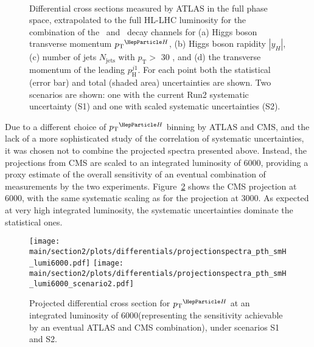 \begin{figure}
  \centering
   \\
  \caption{Differential cross sections measured by ATLAS in the full phase space, extrapolated to the full HL-LHC luminosity for the combination of the \Hyy\ and \HZZ\ decay channels for (a) Higgs boson transverse momentum $\pTH$, (b) Higgs boson rapidity $|y_H|$, (c) number of jets $N_{\mathrm{jets}}$ with  $p_{\mathrm{T}} >$ 30 \UGeV, and (d) the transverse momentum of the leading $p_{\mathrm{H}}^{j1}$. For each point both the statistical (error bar) and total (shaded area) uncertainties are shown. Two scenarios are shown: one with the current Run2 systematic uncertainty (S1) and one with scaled systematic uncertainties (S2).}
   \label{fig:ATLAS_proj_differential}
\end{figure}

Due to a different choice of $\pTH$ binning by ATLAS and CMS, and the lack of a more sophisticated study of the correlation of systematic uncertainties, it was chosen not to combine the projected spectra presented above. Instead, the projections from CMS are scaled to an integrated luminosity of 6000\fbinv, providing a proxy estimate of the overall sensitivity of an eventual combination of measurements by the two experiments. Figure~\ref{fig:proj_pth_6000} shows the CMS projection at 6000\fbinv, with the same systematic scaling as for the projection at 3000\fbinv.  As expected at very high integrated luminosity, the systematic uncertainties dominate the statistical ones.

\begin{figure}%
  \centering
  \texttt{[image: \\main/section2/plots/differentials/projectionspectra\_pth\_smH\_lumi6000.pdf]}
  \texttt{[image: \\main/section2/plots/differentials/projectionspectra\_pth\_smH\_lumi6000\_scenario2.pdf]}
  \caption{Projected differential cross section for $\pTH$ at an integrated luminosity of 6000\fbinv (representing the sensitivity achievable by an eventual ATLAS and CMS combination), under scenarios S1
    and S2.}
  \label{fig:proj_pth_6000}
\end{figure}

